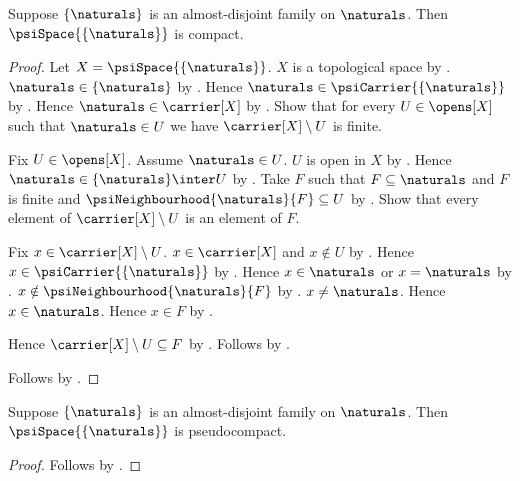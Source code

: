 \begin{theorem}\label{singleton_naturals_psi_space_is_compact}
    Suppose $\{\naturals\}$ is an almost-disjoint family on
        $\naturals$.
    Then $\psiSpace{\{\naturals\}}$ is compact.
\end{theorem}
\begin{proof}
    Let $X=\psiSpace{\{\naturals\}}$.
    $X$ is a topological space by
        .
    $\naturals\in\{\naturals\}$ by .
    Hence $\naturals\in\psiCarrier{\{\naturals\}}$ by
        .
    Hence $\naturals\in\carrier[X]$ by .
    Show that for every $U\in\opens[X]$ such that $\naturals\in U$ we have
        $\carrier[X]\setminus U$ is finite.
    \begin{subproof}
        Fix $U\in\opens[X]$.
        Assume $\naturals\in U$.
        $U$ is open in $X$ by .
        Hence $\naturals\in\{\naturals\}\inter U$ by .
        Take $F$ such that $F\subseteq\naturals$ and $F$ is finite and
            $\psiNeighbourhood{\naturals}{F}\subseteq U$ by
            .
        Show that every element of $\carrier[X]\setminus U$ is an
            element of $F$.
        \begin{subproof}
            Fix $x\in\carrier[X]\setminus U$.
            $x\in\carrier[X]$ and $x\notin U$ by .
            Hence $x\in\psiCarrier{\{\naturals\}}$ by
                .
            Hence $x\in\naturals$ or $x=\naturals$ by
                .
            $x\notin\psiNeighbourhood{\naturals}{F}$ by
                .
            $x\neq\naturals$.
            Hence $x\in\naturals$.
            Hence $x\in F$ by .
        \end{subproof}
        Hence $\carrier[X]\setminus U\subseteq F$ by .
        Follows by .
    \end{subproof}
    Follows by .
\end{proof}

\begin{corollary}\label{singleton_naturals_psi_space_is_pseudocompact}
    Suppose $\{\naturals\}$ is an almost-disjoint family on
        $\naturals$.
    Then $\psiSpace{\{\naturals\}}$ is pseudocompact.
\end{corollary}
\begin{proof}
    Follows by
        .
\end{proof}

